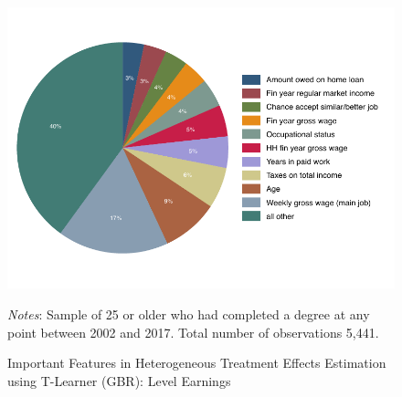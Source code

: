 \documentclass[12pt, a4paper]{article}
\begin{document}
\begin{figure}[htbp]
\centering
\caption{Important Features in Heterogeneous Treatment Effects Estimation using T-Learner (GBR): Level Earnings}
\vspace{0.5cm}
  \label{fig:featgbr}
    \includegraphics{_figures/influenceP_GBR_le_100.pdf}
\parbox{1\textwidth}{\footnotesize{\textit{Notes}: Sample of 25 or older who had completed a degree at any point between 2002 and 2017. Total number of observations 5,441.}}
\end{figure}
\end{document}
